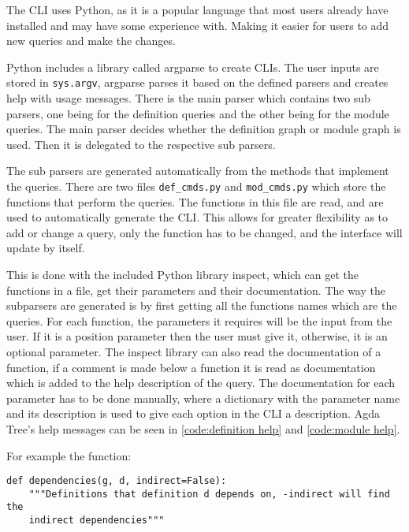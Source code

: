 The CLI uses Python, as it is a popular language that most users already have
installed and may have some experience with. Making it easier for users to add
new queries and make the changes. 

Python includes a library called argparse to create CLIs. The
user inputs are stored in \texttt{sys.argv}, argparse parses it based
on the defined parsers and creates help with usage messages. There is the main
parser which contains two sub parsers, one being for the definition queries and
the other being for the module queries. The main parser decides whether the
definition graph or module graph is used. Then it is delegated to the
respective sub parsers.


The sub parsers are generated automatically from the methods that implement the
queries. There are two files \texttt{def\_cmds.py} and \texttt{mod\_cmds.py} which store the functions
that perform the queries. The functions in this file are read, and are used to
automatically generate the CLI. This allows for greater flexibility as to add
or change a query, only the function has to be changed, and the interface will
update by itself.

This is done with the included Python library inspect, which can get the
functions in a file, get their parameters and their documentation. The way the
subparsers are generated is by first getting all the functions names which are
the queries. For each function, the parameters it requires will be the input
from the user. If it is a position parameter then the user must give it,
otherwise, it is an optional parameter. The inspect library can also read the
documentation of a function, if a comment is made below a function it is read
as documentation which is added to the help description of the query. The
documentation for each parameter has to be done manually, where a dictionary
with the parameter name and its description is used to give each option in the
CLI a description. Agda Tree's help messages can be seen in
\cref{code:definition help} and \cref{code:module help}.

For example the function:

\begin{lstlisting}
def dependencies(g, d, indirect=False):
    """Definitions that definition d depends on, -indirect will find the
    indirect dependencies"""
\end{lstlisting}

